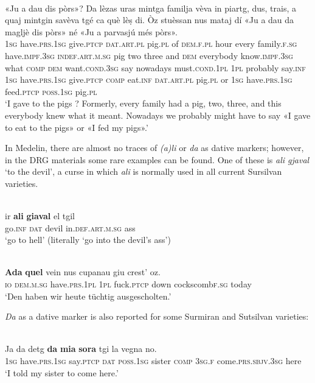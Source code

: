 \ea\label{}
\\
\gll «Ju a dau dis pòrs»? Da lèzas uras mintga familja vèva in piartg, dus, trais, a quaj mintgin savèva tgé ca què lèṣ di. Òz stuèssan nus mataj dí «Ju a dau da magljè dis pòrs» né «Ju a parvasjú més pòrs». \\
    \textsc{1sg} have.\textsc{prs.1sg} give.\textsc{ptcp} \textsc{dat.art.pl} pig.\textsc{pl} of \textsc{dem.f.pl} hour every family.\textsc{f.sg} have.\textsc{impf.3sg} \textsc{indef.art.m.sg} pig two three and  \textsc{dem} everybody know.\textsc{impf.3sg} what \textsc{comp}  \textsc{dem} want.\textsc{cond.3sg} say nowadays must.\textsc{cond.1pl} \textsc{1pl} probably  say.\textsc{inf} \textsc{1sg} have.\textsc{prs.1sg} give.\textsc{ptcp}  \textsc{comp} eat.\textsc{inf} \textsc{dat.art.pl} pig.\textsc{pl} or  \textsc{1sg} have.\textsc{prs.1sg} feed.\textsc{ptcp} \textsc{poss.1sg} pig.\textsc{pl}     \\
\glt `I gave to the pigs ? Formerly, every family had a pig, two, three, and this everybody knew what it meant. Nowadays we probably might have to say «I gave to eat to the pigs» or «I fed my pigs».'
\z

In Medelin, there are almost no traces of \textit{(a)li} or \textit{da} as dative markers; however, in the DRG materials some rare examples can be found. One of these is \textit{ali gjaval} `to the devil', a curse in which \textit{ali} is normally used in all current Sursilvan varieties.

\ea\label{}
\\
\gll   ir \textbf{ali} \textbf{giaval} el tgil\\
    go.\textsc{inf} \textsc{dat} devil in.\textsc{def.art.m.sg} ass\\
\glt `go to hell' (literally `go into the devil’s ass')
\z


\ea\label{}
\\
\gll  \textbf{Ada} \textbf{quel} vein nus cupanau giu crest’ oz.\\
     \textsc{io} \textsc{dem.m.sg} have.\textsc{prs.1pl} \textsc{1pl} fuck.\textsc{ptcp} down cockscomb\textsc{f.sg} today\\
\glt `Den haben wir heute tüchtig ausgescholten.'
\z

\textit{Da} as a dative marker is also reported for some Surmiran and Sutsilvan varieties:

\ea\label{}
\\
\gll  Ja da detg \textbf{da} \textbf{mia} \textbf{sora} tgi la vegna no.\\
      \textsc{1sg} have.\textsc{prs.1sg} say.\textsc{ptcp} \textsc{dat} \textsc{poss.1sg} sister \textsc{comp} \textsc{3sg.f} come.\textsc{prs.sbjv.3sg} here\\
\glt `I told my sister to come here.'
\z



